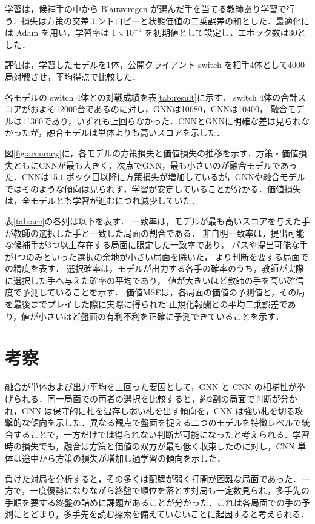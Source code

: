 \documentclass[a4j,dvipdfmx]{jarticle}
\begin{document}
\begin{Abstract}
学習は，候補手の中から Blauweregen が選んだ手を当てる教師あり学習で行う．損失は方策の交差エントロピーと状態価値の二乗誤差の和とした．最適化には Adam を用い，学習率は $1\times10^{-4}$ を初期値として設定し，エポック数は30とした．

評価は，学習したモデルを1体，公開クライアント switch を相手4体として4000局対戦させ，平均得点で比較した．

各モデルの switch 4体との対戦成績を表\ref{tab:result}に示す．
switch 4体の合計スコアがおよそ12000台であるのに対し，GNNは10680，CNNは10400，
融合モデルは11360であり，いずれも上回らなかった．CNNとGNNに明確な差は見られなかったが，融合モデルは単体よりも高いスコアを示した．

図\ref{fig:accuracy}に，各モデルの方策損失と価値損失の推移を示す．方策・価値損失ともにCNNが最も大きく，次点でGNN，最も小さいのが融合モデルであった．CNNは15エポック目以降に方策損失が増加しているが，GNNや融合モデルではそのような傾向は見られず，学習が安定していることが分かる．価値損失は，全モデルとも学習が進むにつれ減少していた．

表\ref{tab:acc}の各列は以下を表す．
一致率は，モデルが最も高いスコアを与えた手が教師の選択した手と一致した局面の割合である．
非自明一致率は，提出可能な候補手が3つ以上存在する局面に限定した一致率であり，
パスや提出可能な手が1つのみといった選択の余地が小さい局面を除いた，
より判断を要する局面での精度を表す．
選択確率は，モデルが出力する各手の確率のうち，教師が実際に選択した手へ与えた確率の平均であり，
値が大きいほど教師の手を高い確信度で予測していることを示す．
価値MSEは，各局面の価値の予測値と，その局を最後までプレイした際に実際に得られた
正規化報酬との平均二乗誤差であり，値が小さいほど盤面の有利不利を正確に予測できていることを示す．

\section{考察}
融合が単体および出力平均を上回った要因として，GNN と CNN の相補性が挙げられる．同一局面での両者の選択を比較すると，約2割の局面で判断が分かれ，GNN は保守的に札を温存し弱い札を出す傾向を，CNN は強い札を切る攻撃的な傾向を示した．異なる観点で盤面を捉える二つのモデルを特徴レベルで統合することで，一方だけでは得られない判断が可能になったと考えられる．学習時の損失でも，融合は方策と価値の双方が最も低く収束したのに対し，CNN 単体は途中から方策の損失が増加し過学習の傾向を示した．

負けた対局を分析すると，その多くは配牌が弱く打開が困難な局面であった．一方で，一度優勢になりながら終盤で順位を落とす対局も一定数見られ，多手先の手順を要する終盤の詰めに課題があることが分かった．これは各局面での手の予測にとどまり，多手先を読む探索を備えていないことに起因すると考えられる．



\end{Abstract}
\end{document}
